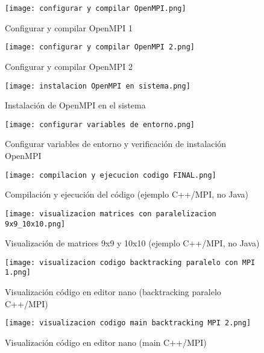 \documentclass[12pt]{article}
\begin{document}
\begin{figure}[H]
    \centering
    \texttt{[image: configurar y compilar OpenMPI.png]}
    \caption{Configurar y compilar OpenMPI 1}
    \label{fig:anexo6}
\end{figure}

\begin{figure}[H]
    \centering
    \texttt{[image: configurar y compilar OpenMPI 2.png]}
    \caption{Configurar y compilar OpenMPI 2}
    \label{fig:anexo7}
\end{figure}

\begin{figure}[H]
    \centering
    \texttt{[image: instalacion OpenMPI en sistema.png]}
    \caption{Instalación de OpenMPI en el sistema}
    \label{fig:anexo8}
\end{figure}

\begin{figure}[H]
    \centering
    \texttt{[image: configurar variables de entorno.png]}
    \caption{Configurar variables de entorno y verificación de instalación OpenMPI}
    \label{fig:anexo9}
\end{figure}

\begin{figure}[H]
    \centering
    \texttt{[image: compilacion y ejecucion codigo FINAL.png]}
    \caption{Compilación y ejecución del código (ejemplo C++/MPI, no Java)}
    \label{fig:anexo10}
\end{figure}

\begin{figure}[H]
    \centering
    \texttt{[image: visualizacion matrices con paralelizacion 9x9\_10x10.png]}
    \caption{Visualización de matrices 9x9 y 10x10 (ejemplo C++/MPI, no Java)}
    \label{fig:anexo11}
\end{figure}

\begin{figure}[H]
    \centering
    \texttt{[image: visualizacion codigo backtracking paralelo con MPI 1.png]}
    \caption{Visualización código en editor nano (backtracking paralelo C++/MPI)}
    \label{fig:anexo12}
\end{figure}

\begin{figure}[H]
    \centering
    \texttt{[image: visualizacion codigo main backtracking MPI 2.png]}
    \caption{Visualización código en editor nano (main C++/MPI)}
    \label{fig:anexo13}
\end{figure}
\end{document}
